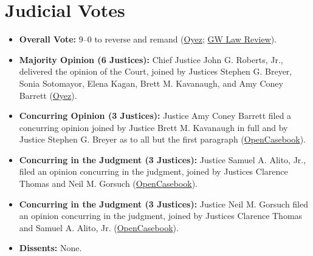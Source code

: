 \documentclass[12pt]{article}
\begin{document}
\section{Judicial Votes}
\begin{itemize}
    \item \textbf{Overall Vote:} 9--0 to reverse and remand (\href{https://www.oyez.org/cases/2020/19-123}{Oyez}; \href{https://www.gwlr.org/two-surprises-in-fulton-v-city-of-philadelphia/}{GW Law Review}).
    \item \textbf{Majority Opinion (6 Justices):} Chief Justice John G. Roberts, Jr., delivered the opinion of the Court, joined by Justices Stephen G. Breyer, Sonia Sotomayor, Elena Kagan, Brett M. Kavanaugh, and Amy Coney Barrett (\href{https://www.oyez.org/cases/2020/19-123}{Oyez}).
    \item \textbf{Concurring Opinion (3 Justices):} Justice Amy Coney Barrett filed a concurring opinion joined by Justice Brett M. Kavanaugh in full and by Justice Stephen G. Breyer as to all but the first paragraph (\href{https://opencasebook.org/casebooks/4501-constitutional-law/resources/12.9-fulton-v-city-of-philadelphia-2020/}{OpenCasebook}).
    \item \textbf{Concurring in the Judgment (3 Justices):} Justice Samuel A. Alito, Jr., filed an opinion concurring in the judgment, joined by Justices Clarence Thomas and Neil M. Gorsuch (\href{https://opencasebook.org/casebooks/4501-constitutional-law/resources/12.9-fulton-v-city-of-philadelphia-2020/}{OpenCasebook}).
    \item \textbf{Concurring in the Judgment (3 Justices):} Justice Neil M. Gorsuch filed an opinion concurring in the judgment, joined by Justices Clarence Thomas and Samuel A. Alito, Jr. (\href{https://opencasebook.org/casebooks/4501-constitutional-law/resources/12.9-fulton-v-city-of-philadelphia-2020/}{OpenCasebook}).
    \item \textbf{Dissents:} None.
\end{itemize}
\end{document}
